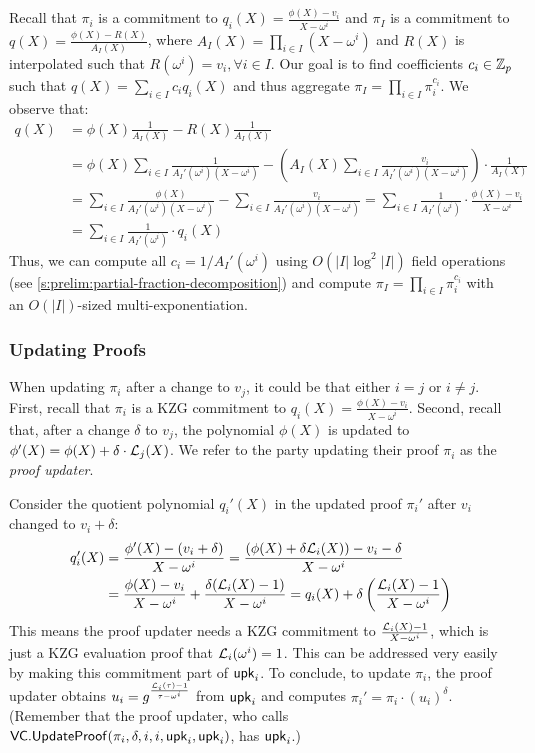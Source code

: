 Recall that $\pi_i$ is a commitment to  $q_i(X)=\frac{\phi(X)-v_i}{X-\omega^i}$ and $\pi_I$ is a commitment to $q(X) = \frac{\phi(X)-R(X)}{A_I(X)}$, where $A_I(X)=\prod_{i\in I} (X-\omega^i)$ and $R(X)$ is interpolated such that $R(\omega^i)=v_i,\forall i\in I$.
Our goal is to find coefficients $c_i\in \mathbb{Z}_p$ such that $q(X)=\sum_{i\in I} c_i q_i(X)$ and thus aggregate $\pi_I=\prod_{i\in I} \pi_i^{c_i}$.
We observe that:
{\ifCameraReady\small\fi
\begin{align}
q(X)&= \phi(X)\frac{1}{A_I(X)}- R(X)\frac{1}{A_I(X)}\\
    &= \phi(X)\sum_{i\in I} \frac{1}{A_I'(\omega^i)(X-\omega^i)} - \left(A_I(X)\sum_{i\in I} \frac{v_i}{A_I'(\omega^i)(X-\omega^i)}\right)\cdot \frac{1}{A_I(X)} \\
	&= \sum_{i\in I} \frac{\phi(X)}{A_I'(\omega^i)(X-\omega^i)} - \sum_{i\in I} \frac{v_i}{A_I'(\omega^i)(X-\omega^i)}
	= \sum_{i\in I} \frac{1}{A_I'(\omega^i)}\cdot \frac{\phi(X) - v_i}{X-\omega^i}\\
	&= \sum_{i\in I} \frac{1}{A_I'(\omega^i)}\cdot q_i(X)
\end{align}
}%
Thus, we can compute all $c_i={1}/{A_I'(\omega^i)}$ using $O(\vert I\vert \log^2{\vert I \vert})$ field operations (see \cref{s:prelim:partial-fraction-decomposition}) and compute $\pi_I=\prod_{i\in I} \pi_i^{c_i}$ with an $O(|I|)$-sized multi-exponentiation.

\subsubsection{Updating Proofs}
\label{s:asvc:from-kzg:updating-proofs}

When updating $\pi_i$ after a change to $v_j$, it could be that either $i=j$ or $i\ne j$.
First, recall that $\pi_i$ is a KZG commitment to $q_i(X)=\frac{\phi(X)-v_i}{X-\omega^i}$.
Second, recall that, after a change $\delta$ to $v_j$, the polynomial $\phi(X)$ is updated to $\phi'(X)=\phi(X)+\delta\cdot\mathcal{L}_j(X)$.
We refer to the party updating their proof $\pi_i$ as the \textit{proof updater}.

Consider the quotient polynomial $q_i'(X)$ in the updated proof $\pi_i'$ after $v_i$ changed to $v_i+\delta$:
{\ifCameraReady\small\fi
\begin{align}
q_i'(X) &=\frac{\phi'(X)-(v_i+\delta)}{X-\omega^i}=\frac{\left(\phi(X) + \delta\mathcal{L}_i(X)\right) - v_i -\delta}{X-\omega^i}\\
&=\frac{\phi(X) - v_i}{X-\omega^i}+\frac{\delta(\mathcal{L}_i(X)-1)}{X-\omega^i} = q_i(X) + \delta\left(\frac{\mathcal{L}_i(X)-1}{X-\omega^i}\right)
\end{align}
}%
This means the proof updater needs a KZG commitment to $\frac{\mathcal{L}_i(X)-1}{X-\omega^i}$, which is just a KZG evaluation proof that $\mathcal{L}_i(\omega^i)=1$.
This can be addressed very easily by making this commitment part of $\mathsf{upk}_i$.
To conclude, to update $\pi_i$, the proof updater obtains $u_i=g^{\frac{\mathcal{L}_i(\tau)-1}{\tau - \omega^i}}$ from $\mathsf{upk}_i$ and computes $\pi_i'=\pi_i \cdot \left(u_i\right)^\delta$.
(Remember that the proof updater, who calls $\mathsf{VC}.\mathsf{UpdateProof}(\pi_i, \delta,i,i,\mathsf{upk}_i,\mathsf{upk}_i)$, has $\mathsf{upk}_i$.)

